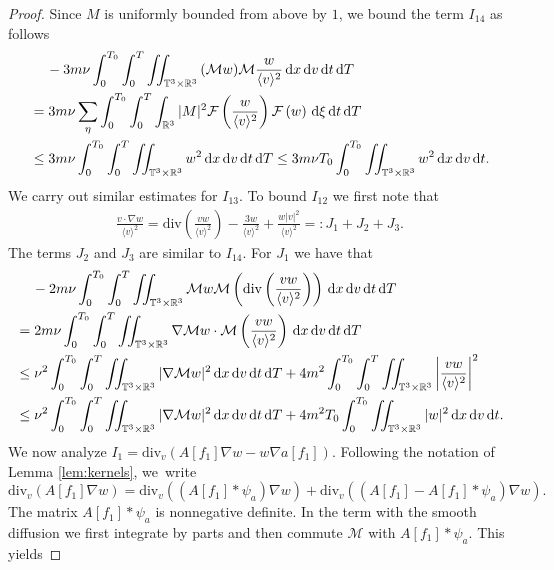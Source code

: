 \documentclass[11pt,american, reqno]{amsart}
\numberwithin{equation}{section}
\newcommand{\R}{\mathbb R}
\newcommand{\1}{\mathds{1}}
\newcommand{\dt}{\, {\rm d} t}
\newcommand{\dT}{\, {\rm d} T}
\newcommand{\dv}{\, {\rm d} v}
\newcommand{\dx}{\, {\rm d} x}
\newcommand{\CalM}{\mathcal{M}}
\newcommand{\dxi}{\, {\rm d} \xi}
\newcommand{\vpran}[1]{\left(#1\right)}
\newcommand{\T}{\mathbb{T}}
\numberwithin{equation}{section}
\begin{document}
\begin{proof}
Since ${M}$ is uniformly bounded from above by $1$, we bound the term ${ I_{14}}$ as follows 
\begin{align*} 
& \quad \,
-3m \nu \int_0^{T_0}\int_0^{T} \iint_{\T^3 \times \R^3} { ( {\CalM} w)  }  {\CalM} { \frac{ w }{\langle v \rangle ^2} } 
\dx\dv\dt\dT
\\
&=3m \nu  \sum_{\eta} \int_0^{T_0}\int_0^{T}\int_{\R^3}  |M|^2 \mathcal{F}\left({ \frac{ w }{\langle v \rangle ^2} }\right) \mathcal{F}\left(w\right) \dxi \dt\dT 
\\
&\le 
3m \nu\int_0^{T_0}\int_0^{T}  \iint_{\T^3 \times \R^3} w^2 \dx\dv\dt\dT 
\leq 
3m \nu T_0 \int_0^{T_0}\iint_{\T^3 \times \R^3} w^2 \dx\dv\dt. 
\end{align*}
We carry out similar estimates for ${I_{13}}$.  To bound ${I_{12}}$ we first note that  
\begin{align*}
\frac{v \cdot \nabla w }{\langle v \rangle ^2} = \textrm{div} \left(\frac{v  w }{\langle v \rangle ^2} \right) - \frac{3w}{\langle v \rangle ^2} +  \frac{w|v|^2 }{\langle v \rangle ^2} =: J_1+J_2+J_3.
\end{align*}
The terms $J_2$ and $J_3$ are similar to $I_{14}$. For $J_1$ we have that 
\begin{align*}
& \quad \,
-2m\nu \int_0^{T_0}\int_0^{T} \iint_{\T^3 \times \R^3}  \CalM w \CalM \left( \textrm{div} \left(\frac{v  w }{\langle v \rangle ^2} \right)\right) \dx\dv\dt\dT 
\\
& = 2m\nu \int_0^{T_0}\int_0^{T} \iint_{\T^3 \times \R^3} \nabla \CalM w \cdot \CalM \left(\frac{v  w }{\langle v \rangle ^2} \right)  \dx\dv\dt\dT 
\\
& \leq \nu^2  \int_0^{T_0}\int_0^{T} \iint_{\T^3 \times \R^3} |\nabla \CalM w|^2 \dx\dv\dt\dT 
+ 4m^2 \int_0^{T_0}\int_0^{T} \iint_{\T^3 \times \R^3}  \left|\frac{v  w }{\langle v \rangle ^2} \right|^2  %
\\
&\leq 
\nu^2  \int_0^{T_0}\int_0^{T} \iint_{\T^3 \times \R^3} |\nabla \CalM w|^2 \dx\dv\dt\dT 
+  4m^2 T_0 \int_0^{T_0} \iint_{\T^3 \times \R^3}  | w|^2  \dx\dv\dt.
\end{align*}
We now analyze $I_1=\textrm{div}_v \left( A[f_1] \nabla w - w \nabla a[f_1]\right)$.  Following the notation of Lemma \ref{lem:kernels}, we~write 
$$
\textrm{div}_v \left( A[f_1] \nabla w\right) = \textrm{div}_v \left( \vpran{A[f_1]\ast \psi_a} \nabla w\right) + \textrm{div}_v \left( (A[f_1]-A[f_1]\ast \psi_a )\nabla w\right).
$$
The matrix $ A[f_1]\ast \psi_a $ is nonnegative definite. In the term with the smooth diffusion we first integrate by parts and then commute $\mathcal{M}$ with $A[f_1]\ast \psi_a $. This yields  

\end{proof}
\end{document}
